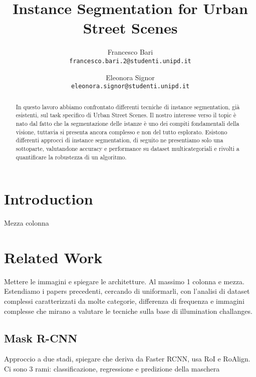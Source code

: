 \documentclass[10pt,twocolumn,letterpaper]{article}
\begin{document}
\title{Instance Segmentation for Urban Street Scenes}

\author{Francesco Bari\\
{\tt\small francesco.bari.2@studenti.unipd.it}
\and
Eleonora Signor\\
{\tt\small eleonora.signor@studenti.unipd.it}
}

\maketitle

\begin{abstract}
In questo lavoro abbiamo confrontato differenti tecniche di instance segmentation, gi\`a esistenti, sul task specifico di Urban Street Scenes. Il nostro interesse verso il topic \`e nato dal fatto che la segmentazione delle istanze \`e uno dei compiti fondamentali della visione, tuttavia si presenta ancora complesso e non del tutto esplorato. Esistono differenti approcci di instance segmentation, di seguito ne presentiamo solo una sottoparte, valutandone accuracy e performance su dataset multicategoriali e rivolti a quantificare la robustezza di un algoritmo.
\end{abstract}

\section{Introduction}
Mezza colonna

\section{Related Work}
Mettere le immagini e spiegare le architetture. Al massimo 1 colonna e mezza.\\
Estendiamo i papers precedenti, cercando di uniformarli, con l'analisi di dataset complessi caratterizzati da molte categorie, differenza di frequenza e immagini complesse che mirano a valutare le tecniche sulla base di illumination challanges.
\subsection{Mask R-CNN}
Approccio a due stadi, spiegare che deriva da Faster RCNN, usa RoI e RoAlign. Ci sono 3 rami: classificazione, regressione e predizione della maschera
\end{document}
